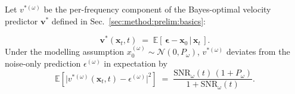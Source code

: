 \begin{lemma} Let $v^{*(\omega)}$ be the per-frequency component of the Bayes-optimal velocity predictor $\mathbf{v}^{*}$ defined in Sec.~\ref{sec:method:prelim:basics}:

\begin{equation}
  \mathbf{v}^*(\mathbf{x}_t, t) \;=\; \mathbb{E}\!\left[\,\boldsymbol{\epsilon} - \mathbf{x}_0 \,\big|\, \mathbf{x}_t\,\right].
  \label{eq:optimal-v}
\end{equation}
Under the modelling assumption $x_0^{(\omega)} \sim \mathcal{N}(0, P_\omega)$, $v^{*(\omega)}$ deviates from the noise-only prediction $\epsilon^{(\omega)}$ in expectation by
\begin{equation}
  \mathbb{E}\!\left[\bigl|v^{*(\omega)}(\mathbf{x}_t, t) - \epsilon^{(\omega)}\bigr|^2\right]
  \;=\; \frac{\mathrm{SNR}_\omega(t)\,(1 + P_\omega)}{1 + \mathrm{SNR}_\omega(t)}.
  \label{eq:velocity-error-optimal}
\end{equation}
\end{lemma}



